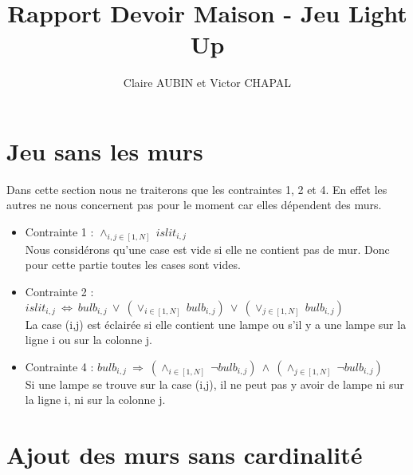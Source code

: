 \documentclass{article}
\begin{document}
\title{Rapport Devoir Maison - Jeu Light Up}
\author{Claire AUBIN et Victor CHAPAL}
\maketitle

\section{Jeu sans les murs}
Dans cette section nous ne traiterons que les contraintes 1, 2 et 4. En effet les autres ne nous concernent pas pour le moment car elles dépendent des murs.

\begin{itemize}
\item Contrainte 1 : $ \wedge_{i,j \in [1,N]} ~ islit_{i,j}  $ \\
 Nous considérons qu'une case est vide si elle ne contient pas de mur. Donc pour cette partie toutes les cases sont vides.
  
\item Contrainte 2 : $ islit_{i,j} ~ \Leftrightarrow ~ bulb_{i,j} ~ \vee ~ (\vee_{i \in [1,N]} ~ bulb_{i,j}) ~ \vee ~ (\vee_{j \in [1,N]} ~ bulb_{i,j}) $\\
  La case (i,j) est éclairée si elle contient une lampe ou s'il y a une lampe sur la ligne i ou sur la colonne j.
  
\item Contrainte 4 : $ bulb_{i,j} ~ \Rightarrow ~ (\wedge_{i \in [1,N]} ~ \neg bulb_{i,j}) ~ \wedge ~ (\wedge_{j \in [1,N]} ~ \neg bulb_{i,j})  $ \\
  Si une lampe se trouve sur la case (i,j), il ne peut pas y avoir de lampe ni sur la ligne i, ni sur la colonne j.
\end{itemize}




\section{Ajout des murs sans cardinalit\'e}
\end{document}
